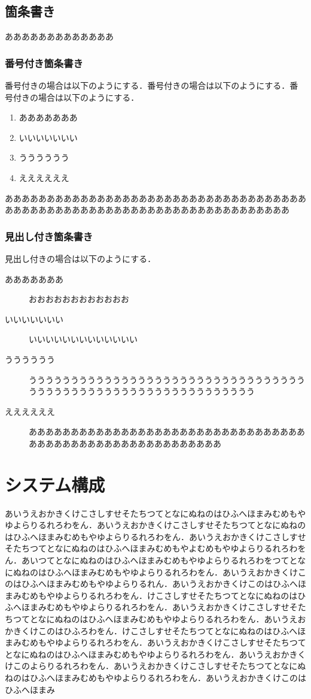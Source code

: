 \begin{multicols*}{2}
\subsection{箇条書き}
あああああああああああああ
\subsubsection{番号付き箇条書き}
番号付きの場合は以下のようにする．番号付きの場合は以下のようにする．番号付きの場合は以下のようにする．
\begin{enumerate}
 \item あああああああ
\item いいいいいいい
\item うううううう
\item ええええええ
\end{enumerate}
ああああああああああああああああああああああああああああああああああああああああああああああああああああああああああああああああああああああ
\subsubsection{見出し付き箇条書き}
見出し付きの場合は以下のようにする．
\begin{description}
 \item[あああああああ]おおおおおおおおおおおお
 \item[いいいいいいい]いいいいいいいいいいいいい
 \item[うううううう]うううううううううううううううううううううううううううううううううううううううううううううううううううううううううううう
 \item[ええええええ]ああああああああああああああああああああああああああああああああああああああああああああああああああああああああ
\end{description}



\section{システム構成}
	あいうえおかきくけこさしすせそたちつてとなにぬねのはひふへほまみむめもやゆよらりるれろわをん．あいうえおかきくけこさしすせそたちつてとなにぬねのはひふへほまみむめもやゆよらりるれろわをん．あいうえおかきくけこさしすせそたちつてとなにぬねのはひふへほまみむめもやよむめもやゆよらりるれろわをん．あいつてとなにぬねのはひふへほまみむめもやゆよらりるれろわをつてとなにぬねのはひふへほまみむめもやゆよらりるれろわをん．あいうえおかきくけこのはひふへほまみむめもやゆよらりるれん．あいうえおかきくけこのはひふへほまみむめもやゆよらりるれろわをん．けこさしすせそたちつてとなにぬねのはひふへほまみむめもやゆよらりるれろわをん．あいうえおかきくけこさしすせそたちつてとなにぬねのはひふへほまみむめもやゆよらりるれろわをん．あいうえおかきくけこのはひふろわをん．けこさしすせそたちつてとなにぬねのはひふへほまみむめもやゆよらりるれろわをん．あいうえおかきくけこさしすせそたちつてとなにぬねのはひふへほまみむめもやゆよらりるれろわをん．あいうえおかきくけこのよらりるれろわをん．あいうえおかきくけこさしすせそたちつてとなにぬねのはひふへほまみむめもやゆよらりるれろわをん．あいうえおかきくけこのはひふへほまみ

\end{multicols*}
